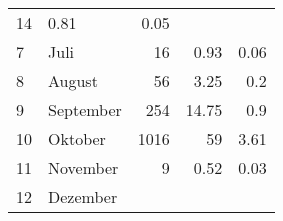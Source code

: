 \begin{longtable}{lXrrr}
       \num{14} &
       \num[round-mode=places,round-precision=2]{0.81} &
         \num[round-mode=places,round-precision=2]{0.05} \\

     7 &
     \multicolumn{1}{X}{ Juli   } &


       \num{16} &
       \num[round-mode=places,round-precision=2]{0.93} &
         \num[round-mode=places,round-precision=2]{0.06} \\

     8 &
     \multicolumn{1}{X}{ August   } &


       \num{56} &
       \num[round-mode=places,round-precision=2]{3.25} &
         \num[round-mode=places,round-precision=2]{0.2} \\

     9 &
     \multicolumn{1}{X}{ September   } &


       \num{254} &
       \num[round-mode=places,round-precision=2]{14.75} &
         \num[round-mode=places,round-precision=2]{0.9} \\

     10 &
     \multicolumn{1}{X}{ Oktober   } &


       \num{1016} &
       \num[round-mode=places,round-precision=2]{59} &
         \num[round-mode=places,round-precision=2]{3.61} \\

     11 &
     \multicolumn{1}{X}{ November   } &


       \num{9} &
       \num[round-mode=places,round-precision=2]{0.52} &
         \num[round-mode=places,round-precision=2]{0.03} \\

     12 &
     \multicolumn{1}{X}{ Dezember   } &



\end{longtable}
